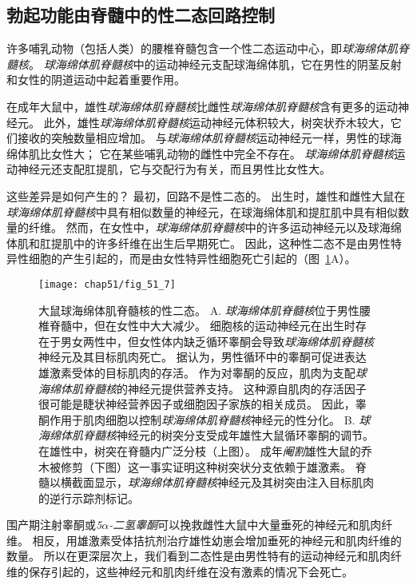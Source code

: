 \subsection{勃起功能由脊髓中的性二态回路控制}

许多哺乳动物（包括人类）的腰椎脊髓包含一个性二态运动中心，即\textit{球海绵体肌脊髓核}。
\textit{球海绵体肌脊髓核}中的运动神经元支配球海绵体肌，它在男性的阴茎反射和女性的阴道运动中起着重要作用。


在成年大鼠中，雄性\textit{球海绵体肌脊髓核}比雌性\textit{球海绵体肌脊髓核}含有更多的运动神经元。
此外，雄性\textit{球海绵体肌脊髓核}运动神经元体积较大，树突状乔木较大，它们接收的突触数量相应增加。
与\textit{球海绵体肌脊髓核}运动神经元一样，男性的球海绵体肌比女性大；
它在某些哺乳动物的雌性中完全不存在。
\textit{球海绵体肌脊髓核}运动神经元还支配肛提肌，它与交配行为有关，而且男性比女性大。


这些差异是如何产生的？
最初，回路不是性二态的。
出生时，雄性和雌性大鼠在\textit{球海绵体肌脊髓核}中具有相似数量的神经元，在球海绵体肌和提肛肌中具有相似数量的纤维。
然而，在女性中，\textit{球海绵体肌脊髓核}中的许多运动神经元以及球海绵体肌和肛提肌中的许多纤维在出生后早期死亡。
因此，这种性二态不是由男性特异性细胞的产生引起的，而是由女性特异性细胞死亡引起的（图~\ref{fig:51_7}A）。


\begin{figure}[htbp]
	\centering
	\texttt{[image: chap51/fig\_51\_7]}
	\caption{大鼠球海绵体肌脊髓核的性二态。
		A. \textit{球海绵体肌脊髓核}位于男性腰椎脊髓中，但在女性中大大减少。
		细胞核的运动神经元在出生时存在于男女两性中，但女性体内缺乏循环睾酮会导致\textit{球海绵体肌脊髓核}神经元及其目标肌肉死亡。
		据认为，男性循环中的睾酮可促进表达雄激素受体的目标肌肉的存活。
		作为对睾酮的反应，肌肉为支配\textit{球海绵体肌脊髓核}的神经元提供营养支持。
		这种源自肌肉的存活因子很可能是睫状神经营养因子或细胞因子家族的相关成员。
		因此，睾酮作用于肌肉细胞以控制\textit{球海绵体肌脊髓核}神经元的性分化\cite{morris2004sexual}。
		B. \textit{球海绵体肌脊髓核}神经元的树突分支受成年雄性大鼠循环睾酮的调节。
		在雄性中，树突在脊髓内广泛分枝（上图）。
		成年\textit{阉割}雄性大鼠的乔木被修剪（下图）这一事实证明这种树突状分支依赖于雄激素。
		脊髓以横截面显示，\textit{球海绵体肌脊髓核}神经元及其树突由注入目标肌肉的逆行示踪剂标记\cite{cooke2005gonadal}。}
	\label{fig:51_7}
\end{figure}


围产期注射睾酮或\textit{5$\alpha$-二氢睾酮}可以挽救雌性大鼠中大量垂死的神经元和肌肉纤维。
相反，用雄激素受体拮抗剂治疗雄性幼崽会增加垂死的神经元和肌肉纤维的数量。
所以在更深层次上，我们看到二态性是由男性特有的运动神经元和肌肉纤维的保存引起的，这些神经元和肌肉纤维在没有激素的情况下会死亡。



